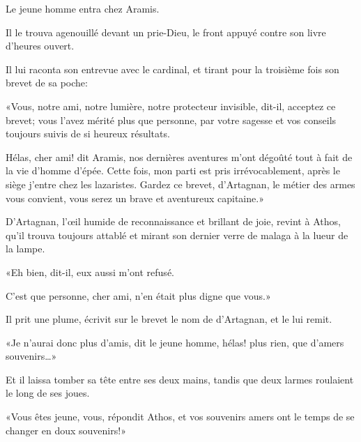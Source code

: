 Le jeune homme entra chez Aramis. 

Il le trouva agenouillé devant un prie-Dieu, le front appuyé contre son livre d'heures ouvert. 

Il lui raconta son entrevue avec le cardinal, et tirant pour la troisième fois son brevet de sa poche: 

«Vous, notre ami, notre lumière, notre protecteur invisible, dit-il, acceptez ce brevet; vous l'avez mérité plus que personne, par votre sagesse et vos conseils toujours suivis de si heureux résultats. 

\speak  Hélas, cher ami! dit Aramis, nos dernières aventures m'ont dégoûté tout à fait de la vie d'homme d'épée. Cette fois, mon parti est pris irrévocablement, après le siège j'entre chez les lazaristes. Gardez ce brevet, d'Artagnan, le métier des armes vous convient, vous serez un brave et aventureux capitaine.» 

D'Artagnan, l'œil humide de reconnaissance et brillant de joie, revint à Athos, qu'il trouva toujours attablé et mirant son dernier verre de malaga à la lueur de la lampe. 

«Eh bien, dit-il, eux aussi m'ont refusé. 

\speak  C'est que personne, cher ami, n'en était plus digne que vous.» 

Il prit une plume, écrivit sur le brevet le nom de d'Artagnan, et le lui remit. 

«Je n'aurai donc plus d'amis, dit le jeune homme, hélas! plus rien, que d'amers souvenirs\dots» 

Et il laissa tomber sa tête entre ses deux mains, tandis que deux larmes roulaient le long de ses joues. 

«Vous êtes jeune, vous, répondit Athos, et vos souvenirs amers ont le temps de se changer en doux souvenirs!»
